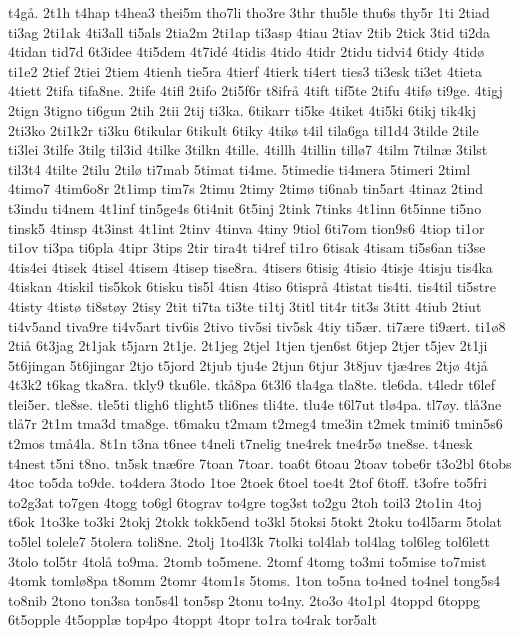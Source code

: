 {t4gå.
2t1h
t4hap
t4hea3
thei5m
tho7li
tho3re
3thr
thu5le
thu6s
thy5r
1ti
2tiad
ti3ag
2ti1ak
4ti3all
ti5als
2tia2m
2ti1ap
ti3asp
4tiau
2tiav
2tib
2tick
3tid
ti2da
4tidan
tid7d
6t3idee
4ti5dem
4t7idé
4tidis
4tido
4tidr
2tidu
tidvi4
6tidy
4tidø
ti1e2
2tief
2tiei
2tiem
4tienh
tie5ra
4tierf
4tierk
ti4ert
ties3
ti3esk
ti3et
4tieta
4tiett
2tifa
tifa8ne.
2tife
4tifl
2tifo
2ti5f6r
t8ifrå
4tift
tif5te
2tifu
4tifø
ti9ge.
4tigj
2tign
3tigno
ti6gun
2tih
2tii
2tij
ti3ka.
6tikarr
ti5ke
4tiket
4ti5ki
6tikj
tik4kj
2ti3ko
2ti1k2r
ti3ku
6tikular
6tikult
6tiky
4tikø
t4il
tila6ga
til1d4
3tilde
2tile
ti3lei
3tilfe
3tilg
til3id
4tilke
3tilkn
4tille.
4tillh
4tillin
tillø7
4tilm
7tilnæ
3tilst
til3t4
4tilte
2tilu
2tilø
ti7mab
5timat
ti4me.
5timedie
ti4mera
5timeri
2timl
4timo7
4tim6o8r
2t1imp
tim7s
2timu
2timy
2timø
ti6nab
tin5art
4tinaz
2tind
t3indu
ti4nem
4t1inf
tin5ge4s
6ti4nit
6t5inj
2tink
7tinks
4t1inn
6t5inne
ti5no
tinsk5
4tinsp
4t3inst
4t1int
2tinv
4tinva
4tiny
9tiol
6ti7om
tion9s6
4tiop
ti1or
ti1ov
ti3pa
ti6pla
4tipr
3tips
2tir
tira4t
ti4ref
ti1ro
6tisak
4tisam
ti5s6an
ti3se
4tis4ei
4tisek
4tisel
4tisem
4tisep
tise8ra.
4tisers
6tisig
4tisio
4tisje
4tisju
tis4ka
4tiskan
4tiskil
tis5kok
6tisku
tis5l
4tisn
4tiso
6tisprå
4tistat
tis4ti.
tis4til
ti5stre
4tisty
4tistø
ti8støy
2tisy
2tit
ti7ta
ti3te
ti1tj
3titl
tit4r
tit3s
3titt
4tiub
2tiut
ti4v5and
tiva9re
ti4v5art
tiv6is
2tivo
tiv5si
tiv5sk
4tiy
ti5ær.
ti7ære
ti9ært.
ti1ø8
2tiå
6t3jag
2t1jak
t5jarn
2t1je.
2t1jeg
2tjel
1tjen
tjen6st
6tjep
2tjer
t5jev
2t1ji
5t6jingan
5t6jingar
2tjo
t5jord
2tjub
tju4e
2tjun
6tjur
3t8juv
tjæ4res
2tjø
4tjå
4t3k2
t6kag
tka8ra.
tkly9
tku6le.
tkå8pa
6t3l6
tla4ga
tla8te.
tle6da.
t4ledr
t6lef
tlei5er.
tle8se.
tle5ti
tligh6
tlight5
tli6nes
tli4te.
tlu4e
t6l7ut
tlø4pa.
tl7øy.
tlå3ne
tlå7r
2t1m
tma3d
tma8ge.
t6maku
t2mam
t2meg4
tme3in
t2mek
tmini6
tmin5s6
t2mos
tmå4la.
8t1n
t3na
t6nee
t4neli
t7nelig
tne4rek
tne4r5ø
tne8se.
t4nesk
t4nest
t5ni
t8no.
tn5sk
tnæ6re
7toan
7toar.
toa6t
6toau
2toav
tobe6r
t3o2bl
6tobs
4toc
to5da
to9de.
to4dera
3todo
1toe
2toek
6toel
toe4t
2tof
6toff.
t3ofre
to5fri
to2g3at
to7gen
4togg
to6gl
6tograv
to4gre
tog3st
to2gu
2toh
toil3
2to1in
4toj
t6ok
1to3ke
to3ki
2tokj
2tokk
tokk5end
to3kl
5toksi
5tokt
2toku
to4l5arm
5tolat
to5lel
tolele7
5tolera
toli8ne.
2tolj
1to4l3k
7tolki
tol4lab
tol4lag
tol6leg
tol6lett
3tolo
tol5tr
4tolå
to9ma.
2tomb
to5mene.
2tomf
4tomg
to3mi
to5mise
to7mist
4tomk
tomlø8pa
t8omm
2tomr
4tom1s
5toms.
1ton
to5na
to4ned
to4nel
tong5s4
to8nib
2tono
ton3sa
ton5s4l
ton5sp
2tonu
to4ny.
2to3o
4to1pl
4toppd
6toppg
6t5opple
4t5opplæ
top4po
4toppt
4topr
to1ra
to4rak
tor5alt
}
